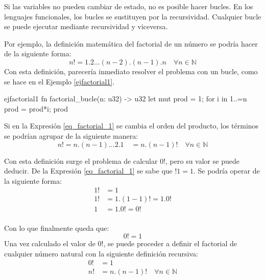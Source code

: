 Si las variables no pueden cambiar de estado, no es posible hacer bucles. En los lenguajes funcionales, los bucles se sustituyen por la recursividad. Cualquier bucle se puede ejecutar mediante recursividad y viceversa.

Por ejemplo, la definición matemática del factorial de un número se podría hacer de la siguiente forma:
\begin{equation}
   \label{eq_factorial_1}
   n! = 1.2...(n-2).(n-1).n \quad \forall n \in \mathds{N} 	
\end{equation}
Con esta definición, parecería inmediato resolver el problema con un bucle, como se hace en el Ejemplo \ref{ejfactorial1}.

\vspace{1em}
\begin{EjemploCodigo}{ejfactorial1}
   fn factorial_bucle(n: u32) -> u32 {
      let mut prod = 1;
      for i in 1..=n {
         prod = prod*i;
      }
      prod
   }
\end{EjemploCodigo}

Si en la Expresión \ref{eq_factorial_1} se cambia el orden del producto, los términos se podrían agrupar de la siguiente manera:
\begin{equation}
   \label{eq_factorial_2}
   n! = n.(n-1)...2.1 \quad = n . (n-1)! \quad \forall n \in \mathds{N} 	
\end{equation}

Con esta definición surge el problema de calcular $0!$, pero su valor se puede deducir. De la Expresión \ref{eq_factorial_1} se sabe que $!1 = 1$. Se podría operar de la siguiente forma:
\begin{align*}
   1! &= 1 \\
   1! &= 1. (1-1)! = 1 . 0! \\
   1  &= 1 . 0! = 0! \\
\end{align*}

Con lo que finalmente queda que:
\begin{equation}
   \label{eq_factorial_3}
   0! = 1
\end{equation}
Una vez calculado el valor de $0!$, se puede proceder a definir el factorial de cualquier número natural con la siguiente definición recursiva:
\begin{align} \label{eq_factorial_4}		
   0! &= 1 \nonumber \\
   n! &= n . (n-1)! \quad \forall n \in \mathds{N} 
\end{align}

